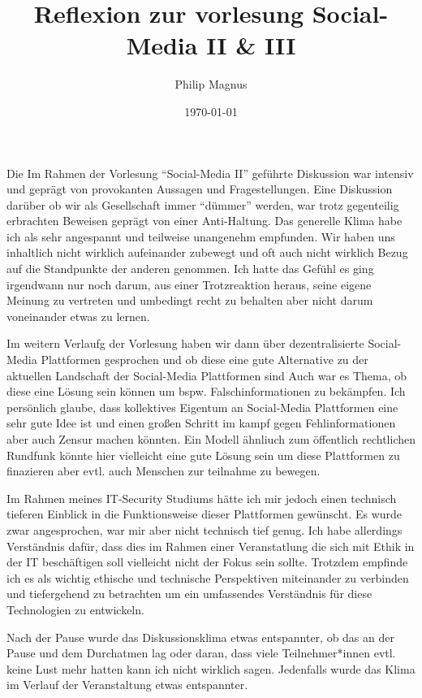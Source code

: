 \documentclass[12pt]{article}
\title{Reflexion zur vorlesung Social-Media II \& III}
\author{Philip Magnus}
\date{\today}
\begin{document}
\maketitle


Die Im Rahmen der Vorlesung ``Social-Media II'' geführte Diskussion war intensiv und geprägt von provokanten Aussagen und Fragestellungen. Eine Diskussion darüber ob wir als Gesellschaft immer ``dümmer'' werden, war trotz gegenteilig erbrachten Beweisen geprägt von einer Anti-Haltung.
Das generelle Klima habe ich als sehr angespannt und teilweise unangenehm empfunden. Wir haben uns inhaltlich nicht wirklich aufeinander zubewegt und oft auch nicht wirklich Bezug auf die Standpunkte der anderen genommen.
Ich hatte das Gefühl es ging irgendwann nur noch darum, aus einer Trotzreaktion heraus, seine eigene Meinung zu vertreten und umbedingt recht zu behalten aber nicht darum voneinander etwas zu lernen.

\vspace{1em}

Im weitern Verlaufg der Vorlesung haben wir dann über dezentralisierte Social-Media Plattformen gesprochen und ob diese eine gute Alternative zu der aktuellen Landschaft der Social-Media Plattformen sind
Auch war es Thema, ob diese eine  Lösung sein können um bspw. Falschinformationen zu bekämpfen. Ich persönlich glaube, dass kollektives Eigentum an Social-Media Plattformen eine sehr gute Idee ist und einen großen Schritt im kampf gegen Fehlinformationen aber auch Zensur machen könnten.
Ein Modell ähnliuch zum öffentlich rechtlichen Rundfunk könnte hier vielleicht eine gute Lösung sein um diese Plattformen zu finazieren aber evtl. auch Menschen zur teilnahme zu bewegen.

\vspace{1em}

Im Rahmen meines IT-Security Studiums hätte ich mir jedoch einen technisch tieferen Einblick in die Funktionsweise dieser Plattformen gewünscht. Es wurde zwar angesprochen, war mir aber nicht technisch tief genug. Ich habe allerdings Verständnis dafür, dass dies im Rahmen einer Veranstatlung die sich mit Ethik in der IT beschäftigen soll vielleicht nicht der Fokus sein sollte.
Trotzdem empfinde ich es als wichtig ethische und technische Perspektiven miteinander zu verbinden und tiefergehend zu betrachten um ein umfassendes Verständnis für diese Technologien zu entwickeln.

\vspace{1em}

Nach der Pause wurde das Diskussionsklima etwas entspannter, ob das an der Pause und dem Durchatmen lag oder daran, dass viele Teilnehmer*innen evtl. keine Lust mehr hatten kann ich nicht wirklich sagen.
Jedenfalls wurde das Klima im Verlauf der Veranstaltung etwas entspannter.
\end{document}
